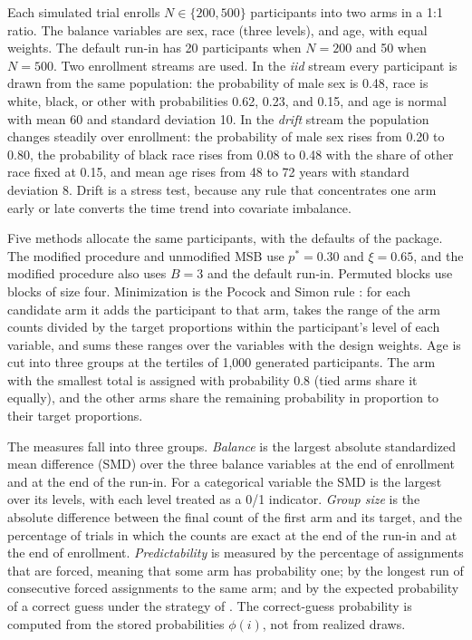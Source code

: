 \documentclass[bib]{statapress}
\begin{document}
Each simulated trial enrolls $N \in \{200, 500\}$ participants into two arms in a
1:1 ratio. The balance variables are sex, race (three levels), and age, with
equal weights. The default run-in has 20 participants when $N = 200$ and 50 when
$N = 500$. 
Two enrollment streams are used. In the \emph{iid} stream every
participant is drawn from the same population: the probability of male sex is
0.48, race is white, black, or other with probabilities 0.62, 0.23, and 0.15,
and age is normal with mean 60 and standard deviation 10. In the \emph{drift}
stream the population changes steadily 
over enrollment: the probability of male
sex rises from 0.20 to 0.80, the probability of black race rises from 0.08 to
0.48 with the share of other race fixed at 0.15, and mean age rises from 48 to 72
years with standard deviation 8. Drift is a stress test, because any rule that
concentrates one arm early or late converts the time trend into covariate
imbalance.

Five methods allocate the same participants, with the defaults of the package.
The modified procedure and unmodified MSB use $p^\ast = 0.30$ and $\xi = 0.65$,
and the modified procedure also uses $B = 3$ and the default run-in. Permuted
blocks use blocks of size four. 
Minimization is the Pocock and Simon rule
\citep{pocock1975}: for each candidate arm it adds the participant to that arm,
takes the range of the arm counts divided by the target proportions within the
participant's level of each variable, and sums these ranges over the variables
with the design weights. Age is cut into three groups at the tertiles of 1,000
generated participants. The arm with the smallest total is assigned with
probability 0.8 (tied arms share it equally), and the other arms share the
remaining probability in proportion to their target proportions.

The measures fall into three groups. \emph{Balance} is the largest absolute standardized
mean difference (SMD) \citep{austin2009} over the three balance variables at the
end of enrollment and at the end of the 
run-in. For a categorical variable the
SMD is the largest over its levels, with each level treated as a 0/1 indicator.
\emph{Group size} is the absolute difference between the final count of the
first arm and its target, and the percentage of trials in which the counts are
exact at the end of the 
run-in and at the end of enrollment.
\emph{Predictability} is measured by the percentage of assignments that are
forced, meaning that some arm has probability one; by the longest run of
consecutive forced assignments to the same arm; and by the expected probability
of a correct guess under the strategy of \citet{blackwell1957}. The
correct-guess probability is computed from the stored probabilities $\phi(i)$,
not from realized draws.
\end{document}
